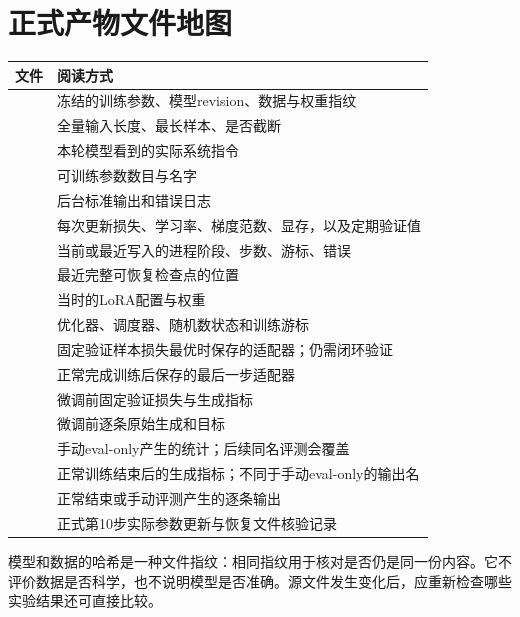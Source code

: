 \section{正式产物文件地图}
\begin{longtable}{P{58mm}P{93mm}}
\toprule
文件 & 阅读方式\\
\midrule
\endhead
{} & 冻结的训练参数、模型revision、数据与权重指纹\\
 & 全量输入长度、最长样本、是否截断\\
 & 本轮模型看到的实际系统指令\\
 & 可训练参数数目与名字\\
 & 后台标准输出和错误日志\\
 & 每次更新损失、学习率、梯度范数、显存，以及定期验证值\\
 & 当前或最近写入的进程阶段、步数、游标、错误\\
 & 最近完整可恢复检查点的位置\\
 & 当时的LoRA配置与权重\\
 & 优化器、调度器、随机数状态和训练游标\\
 & 固定验证样本损失最优时保存的适配器；仍需闭环验证\\
 & 正常完成训练后保存的最后一步适配器\\
 & 微调前固定验证损失与生成指标\\
 & 微调前逐条原始生成和目标\\
 & 手动eval-only产生的统计；后续同名评测会覆盖\\
 & 正常训练结束后的生成指标；不同于手动eval-only的输出名\\
 & 正常结束或手动评测产生的逐条输出\\
 & 正式第10步实际参数更新与恢复文件核验记录\\
\bottomrule
\end{longtable}

模型和数据的哈希是一种文件指纹：相同指纹用于核对是否仍是同一份内容。它不评价数据是否科学，也不说明模型是否准确。源文件发生变化后，应重新检查哪些实验结果还可直接比较。

